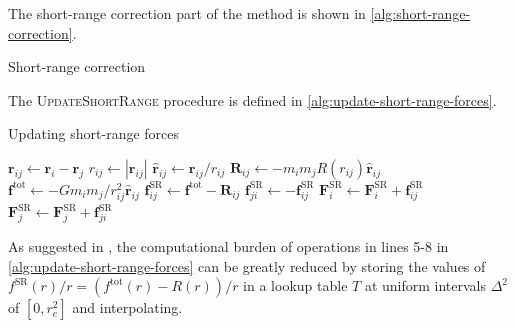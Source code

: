 The short-range correction part of the \PThreeM{} method is shown in \autoref{alg:short-range-correction}.
\begin{algorithm}
    \caption{Short-range correction}\label{alg:short-range-correction}
    \begin{algorithmic}
        \Break
        \EndIf
        \State {}
        \EndFor
        \EndFor
        \EndFor
        \EndFor
    \end{algorithmic}
\end{algorithm}
The \textsc{UpdateShortRange} procedure is defined in \autoref{alg:update-short-range-forces}.
\begin{algorithm}
    \caption{Updating short-range forces}\label{alg:update-short-range-forces}
    \begin{algorithmic}[1]
        \Return
        \EndIf
        \State $\mathbf{r}_{ij} \gets \mathbf{r}_i - \mathbf{r}_j$
        \Return
        \EndIf
        \State $r_{ij} \gets |\mathbf{r}_{ij}|$
        \State $\hat{\mathbf{r}}_{ij} \gets \mathbf{r}_{ij} / r_{ij}$
        \State $\mathbf{R}_{ij} \gets -m_i m_j R(r_{ij}) \hat{\mathbf{r}}_{ij}$
        \State $\mathbf{f}^\text{tot} \gets -G m_i m_j / r_{ij}^2 \hat{\mathbf{r}}_{ij}$
        \State $\mathbf{f}^\text{SR}_{ij} \gets \mathbf{f}^\text{tot} - \mathbf{R}_{ij}$
        \State $\mathbf{f}^\text{SR}_{ji} \gets -\mathbf{f}^\text{SR}_{ij}$
        \State $\mathbf{F}^\text{SR}_i \gets \mathbf{F}^\text{SR}_i + \mathbf{f}^\text{SR}_{ij}$
         
        \State $\mathbf{F}^\text{SR}_j \gets \mathbf{F}^\text{SR}_j + \mathbf{f}^\text{SR}_{ji}$
        \EndIf
        \EndProcedure
    \end{algorithmic}
\end{algorithm}
As suggested in \cite{Hockney1988}, the computational burden of operations in lines 5-8 in \autoref{alg:update-short-range-forces} can be greatly reduced by storing the values of $f^\text{SR}(r) / r = (f^\text{tot}(r) - R(r)) / r$ in a lookup table $T$ at uniform intervals $\Delta^2$ of $[0, r_e^2]$ and interpolating.
